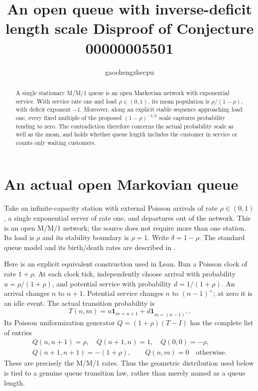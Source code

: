 \documentclass[11pt]{article}
\title{An open queue with inverse-deficit length scale\newline
\large Disproof of Conjecture 00000005501}
\author{gaochengzhecpu}\date{}
\begin{document}
\maketitle
\begin{abstract}
A single stationary M/M/1 queue is an open Markovian
network with exponential service. With service rate one
and load $\rho\in(0,1)$, its mean population is
$\rho/(1-\rho)$, with deficit exponent $-1$.
Moreover, along an explicit stable sequence approaching
load one, every fixed multiple of the proposed
$(1-\rho)^{-1/2}$ scale captures probability tending to
zero. The contradiction therefore concerns the actual
probability scale as well as the mean, and holds whether
queue length includes the customer in service or counts
only waiting customers.
\end{abstract}

\section*{An actual open Markovian queue}
Take an infinite-capacity station with external Poisson
arrivals of rate $\rho\in(0,1)$, a single exponential
server of rate one, and departures out of the network.
This is an open M/M/1 network; the source does not require
more than one station. Its load is $\rho$ and its
stability boundary is $\rho=1$. Write $\delta=1-\rho$.
The standard queue model and its birth/death rates are
described in \cite{modiano}.

Here is an explicit equivalent construction used in Lean.
Run a Poisson clock of rate $1+\rho$. At each clock tick,
independently choose arrival with probability
$u=\rho/(1+\rho)$, and potential service with probability
$d=1/(1+\rho)$. An arrival changes $n$ to $n+1$.
Potential service changes $n$ to $(n-1)^+$; at zero it
is an idle event. The actual transition probability is
\[
 T(n,m)=u\boldsymbol1_{m=n+1}
           +d\boldsymbol1_{m=(n-1)^+}.
\]
Its Poisson uniformization generator $Q=(1+\rho)(T-I)$
has the complete list of entries
\begin{gather*}
 Q(n,n+1)=\rho,\quad Q(n+1,n)=1,\quad Q(0,0)=-\rho,\\
 Q(n+1,n+1)=-(1+\rho),
 \qquad Q(n,m)=0\quad\text{otherwise}.
\end{gather*}
These are precisely the M/M/1 rates. Thus the geometric
distribution used below is tied to a genuine queue
transition law, rather than merely named as a queue length.

\newpage
\end{document}

